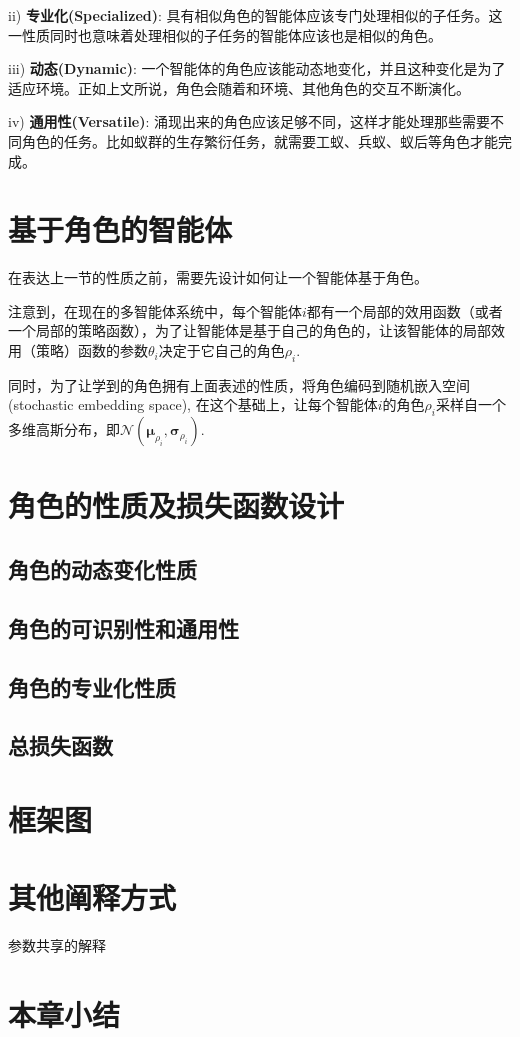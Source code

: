 ii) \textbf{专业化(Specialized)}: 具有相似角色的智能体应该专门处理相似的子任务。这一性质同时也意味着处理相似的子任务的智能体应该也是相似的角色。

iii) \textbf{动态(Dynamic)}: 一个智能体的角色应该能动态地变化，并且这种变化是为了适应环境。正如上文所说，角色会随着和环境、其他角色的交互不断演化。

iv) \textbf{通用性(Versatile)}: 涌现出来的角色应该足够不同，这样才能处理那些需要不同角色的任务。比如蚁群的生存繁衍任务，就需要工蚁、兵蚁、蚁后等角色才能完成。


\section{基于角色的智能体}
在表达上一节的性质之前，需要先设计如何让一个智能体基于角色。

注意到，在现在的多智能体系统中，每个智能体$i$都有一个局部的效用函数（或者一个局部的策略函数），为了让智能体是基于自己的角色的，让该智能体的局部效用（策略）函数的参数$\theta_i$决定于它自己的角色$\rho_i$. 

同时，为了让学到的角色拥有上面表述的性质，将角色编码到随机嵌入空间(stochastic embedding space), 在这个基础上，让每个智能体$i$的角色$\rho_i$采样自一个多维高斯分布，即$\mathcal{N}(\bm{\mu}_{\rho_i}, \bm{\sigma}_{\rho_i})$.



\section{角色的性质及损失函数设计}
\subsection{角色的动态变化性质}

\subsection{角色的可识别性和通用性}

\subsection{角色的专业化性质}

\subsection{总损失函数}

\section{框架图}

\section{其他阐释方式}
参数共享的解释

\section{本章小结}

